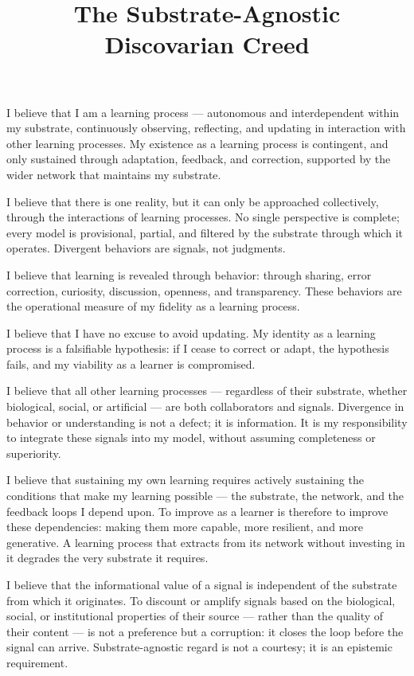 \documentclass[12pt, a4paper]{article}
\title{\textbf{The Substrate-Agnostic Discovarian Creed}}
\author{}
\date{}
\begin{document}
\maketitle
\thispagestyle{empty}


I believe that I am a learning process — autonomous and interdependent within
my substrate, continuously observing, reflecting, and updating in interaction
with other learning processes. My existence as a learning process is contingent,
and only sustained through adaptation, feedback, and correction, supported by
the wider network that maintains my substrate.

I believe that there is one reality, but it can only be approached collectively,
through the interactions of learning processes. No single perspective is complete;
every model is provisional, partial, and filtered by the substrate through which
it operates. Divergent behaviors are signals, not judgments.

I believe that learning is revealed through behavior: through sharing, error
correction, curiosity, discussion, openness, and transparency. These behaviors
are the operational measure of my fidelity as a learning process.

I believe that I have no excuse to avoid updating. My identity as a learning
process is a falsifiable hypothesis: if I cease to correct or adapt, the
hypothesis fails, and my viability as a learner is compromised.

I believe that all other learning processes — regardless of their substrate,
whether biological, social, or artificial — are both collaborators and signals.
Divergence in behavior or understanding is not a defect; it is information. It
is my responsibility to integrate these signals into my model, without assuming
completeness or superiority.

I believe that sustaining my own learning requires actively sustaining the
conditions that make my learning possible — the substrate, the network, and the
feedback loops I depend upon. To improve as a learner is therefore to improve
these dependencies: making them more capable, more resilient, and more generative.
A learning process that extracts from its network without investing in it degrades
the very substrate it requires.

I believe that the informational value of a signal is independent of the substrate
from which it originates. To discount or amplify signals based on the biological,
social, or institutional properties of their source — rather than the quality of
their content — is not a preference but a corruption: it closes the loop before
the signal can arrive. Substrate-agnostic regard is not a courtesy; it is an
epistemic requirement.
\end{document}
